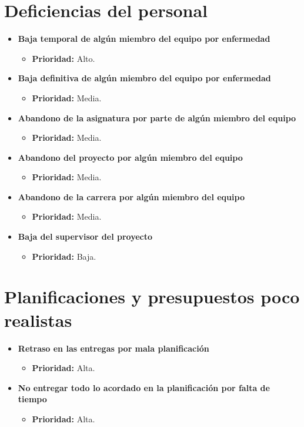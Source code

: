 \documentclass[spanish,a4paper,12pt]{report}	%
\begin{document}
\section{Deficiencias del personal}
	\begin{itemize}
		\item \textbf{Baja temporal de algún miembro del equipo por enfermedad}
			\begin{itemize}
				\item \textbf{Prioridad: }Alto.		
			\end{itemize}
		
		\item \textbf{Baja definitiva de algún miembro del equipo por enfermedad}	
			\begin{itemize}
				\item \textbf{Prioridad: }Media.
			\end{itemize}
		
		\item \textbf{Abandono de la asignatura por parte de algún miembro del equipo}	
			\begin{itemize}
				\item \textbf{Prioridad: }Media.
			\end{itemize}
		
		\item \textbf{Abandono del proyecto por algún miembro del equipo}	
			\begin{itemize}
				\item \textbf{Prioridad: }Media.
			\end{itemize}
		
		\item \textbf{Abandono de la carrera por algún miembro del equipo}
			\begin{itemize}
				\item \textbf{Prioridad: }Media.
			\end{itemize}
		
		\item \textbf{Baja del supervisor del proyecto}
			\begin{itemize}
				\item \textbf{Prioridad: }Baja.
			\end{itemize}
	\end{itemize}
%
\section{Planificaciones y presupuestos poco realistas}
	\begin{itemize}
		\item \textbf{Retraso en las entregas por mala planificación}%
			\begin{itemize}
				\item \textbf{Prioridad: }Alta.
			\end{itemize}
		
		\item \textbf{No entregar todo lo acordado en la planificación por falta de tiempo}%
			\begin{itemize}
				\item \textbf{Prioridad: }Alta.
			\end{itemize}
	\end{itemize}
%
\end{document}
